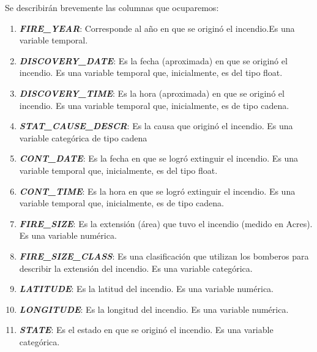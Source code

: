 Se describirán brevemente las columnas que ocuparemos:
\begin{enumerate}
    \item \textit{\textbf{FIRE\_YEAR}}: Corresponde al año en que se originó el incendio.Es una variable temporal.
    \item \textit{\textbf{DISCOVERY\_DATE}}: Es la fecha (aproximada) en que se originó el incendio. Es una variable temporal que, inicialmente, es del tipo float.
    \item \textit{\textbf{DISCOVERY\_TIME}}: Es la hora (aproximada) en que se originó el incendio. Es una variable temporal que, inicialmente, es de tipo cadena.
    \item \textit{\textbf{STAT\_CAUSE\_DESCR}}: Es la causa que originó el incendio. Es una variable categórica de tipo cadena
    \item \textit{\textbf{CONT\_DATE}}: Es la fecha en que se logró extinguir el incendio. Es una variable temporal que, inicialmente, es del tipo float.
    \item \textit{\textbf{CONT\_TIME}}: Es la hora en que se logró extinguir el incendio. Es una variable temporal que, inicialmente, es de tipo cadena.
    \item \textit{\textbf{FIRE\_SIZE}}: Es la extensión (área) que tuvo el incendio (medido en Acres). Es una variable numérica.
    \item \textit{\textbf{FIRE\_SIZE\_CLASS}}: Es una clasificación que utilizan los bomberos para describir la extensión del incendio. Es una variable categórica.
    \item \textit{\textbf{LATITUDE}}: Es la latitud del incendio. Es una variable numérica.
    \item \textit{\textbf{LONGITUDE}}: Es la longitud del incendio. Es una variable numérica.
    \item \textit{\textbf{STATE}}: Es el estado en que se originó el incendio. Es una variable categórica.
\end{enumerate}

